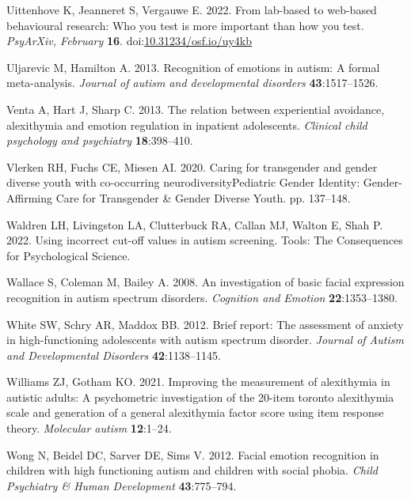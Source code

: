 \documentclass[
]{article}
\newlength{\cslhangindent}
\newlength{\cslentryspacingunit} %
\newenvironment{CSLReferences}[2] %
 {%
  \setlength{\parindent}{0pt}
  \ifodd #1
  \let\oldpar\par
  \def\par{\hangindent=\cslhangindent\oldpar}
  \fi
  \setlength{\parskip}{#2\cslentryspacingunit}
 }%
 {}
\begin{document}
\begin{CSLReferences}{1}{0}
\leavevmode{}%
Uittenhove K, Jeanneret S, Vergauwe E. 2022. From lab-based to web-based behavioural research: Who you test is more important than how you test. \emph{PsyArXiv, February} \textbf{16}. doi:\href{https://doi.org/10.31234/osf.io/uy4kb}{10.31234/osf.io/uy4kb}

\leavevmode{}%
Uljarevic M, Hamilton A. 2013. Recognition of emotions in autism: A formal meta-analysis. \emph{Journal of autism and developmental disorders} \textbf{43}:1517--1526.

\leavevmode{}%
Venta A, Hart J, Sharp C. 2013. The relation between experiential avoidance, alexithymia and emotion regulation in inpatient adolescents. \emph{Clinical child psychology and psychiatry} \textbf{18}:398--410.

\leavevmode{}%
Vlerken RH, Fuchs CE, Miesen AI. 2020. Caring for transgender and gender diverse youth with co-occurring neurodiversityPediatric Gender Identity: Gender-Affirming Care for Transgender \& Gender Diverse Youth. pp. 137--148.

\leavevmode{}%
Waldren LH, Livingston LA, Clutterbuck RA, Callan MJ, Walton E, Shah P. 2022. Using incorrect cut-off values in autism screening. Tools: The Consequences for Psychological Science.

\leavevmode{}%
Wallace S, Coleman M, Bailey A. 2008. An investigation of basic facial expression recognition in autism spectrum disorders. \emph{Cognition and Emotion} \textbf{22}:1353--1380.

\leavevmode{}%
White SW, Schry AR, Maddox BB. 2012. Brief report: The assessment of anxiety in high-functioning adolescents with autism spectrum disorder. \emph{Journal of Autism and Developmental Disorders} \textbf{42}:1138--1145.

\leavevmode{}%
Williams ZJ, Gotham KO. 2021. Improving the measurement of alexithymia in autistic adults: A psychometric investigation of the 20-item toronto alexithymia scale and generation of a general alexithymia factor score using item response theory. \emph{Molecular autism} \textbf{12}:1--24.

\leavevmode{}%
Wong N, Beidel DC, Sarver DE, Sims V. 2012. Facial emotion recognition in children with high functioning autism and children with social phobia. \emph{Child Psychiatry \& Human Development} \textbf{43}:775--794.


\end{CSLReferences}
\end{document}
